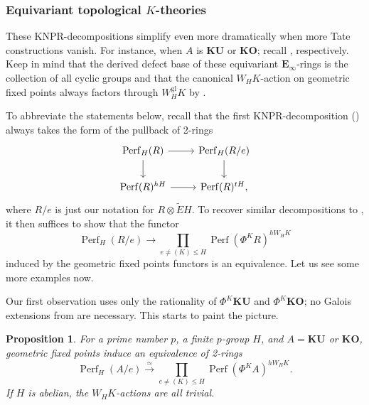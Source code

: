 \documentclass[11pt, a4paper]{article}
\newcommand{\gl}{\mathrm{gl}}
\newcommand{\1}{\mathbf{1}}
\newcommand{\gKU}{{\mathbf{KU}}}
\newcommand{\gKO}{{\mathbf{KO}}}
\DeclareMathOperator{\Perf}{Perf}
\newcommand{\E}{\mathbf{E}}
\theoremstyle{plain}
\newtheorem{prop}[equation]{Proposition}
\theoremstyle{definition}
\theoremstyle{remark}\numberwithin{equation}{section}
\begin{document}
\subsubsection{Equivariant topological \texorpdfstring{$K$}{K}-theories}
These KNPR-decompositions simplify even more dramatically when more Tate constructions vanish. For instance, when $A$ is $\gKU$ or $\gKO$; recall , respectively. Keep in mind that the derived defect base of these equivariant $\E_\infty$-rings is the collection of all cyclic groups and that the canonical $W_H K$-action on geometric fixed points always factors through $W_H^\gl K$ by .

To abbreviate the statements below, recall that the first KNPR-decomposition () always takes the form of the pullback of 2-rings
\begin{equation}\label{eq:help_to_translate}\begin{tikzcd}
    {\Perf_H(R)}\ar[r]\ar[d]    &   {\Perf_H(R/e)}\ar[d]    \\
    {\Perf(R)^{hH}}\ar[r]       &   {\Perf(R)^{tH},}
\end{tikzcd}\end{equation}
where $R/e$ is just our notation for $R \otimes \widetilde{E}H$. To recover similar decompositions to , it then suffices to show that the functor
\[\Perf_H(R/e) \to \prod_{e\neq (K) \leq H} \Perf(\Phi^K R)^{hW_H K}\]
induced by the geometric fixed points functors is an equivalence. Let us see some more examples now.

Our first observation uses only the rationality of $\Phi^K \gKU$ and $\Phi^K \gKO$; no Galois extensions from  are necessary. This starts to paint the picture.

\begin{prop}\label{pr:KU_decomp_abelian}
    For a prime number $p$, a finite $p$-group $H$, and $A=\gKU$ or $\gKO$, geometric fixed points induce an equivalence of 2-rings
    \[\Perf_H(A/e) \xrightarrow{\simeq} \prod_{e\neq (K)\leq H} \Perf(\Phi^{K}A)^{hW_H K}.\]
    If $H$ is abelian, the $W_H K$-actions are all trivial.
\end{prop}
\end{document}
